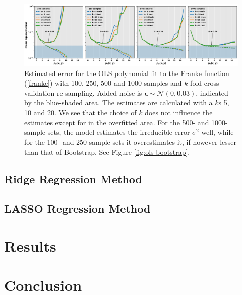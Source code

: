 \documentclass[]{article}
\begin{document}
\begin{figure}[!htb]
	\centering
	\includegraphics[width=1\linewidth]{./results/ols-cv.png}
	\caption{Estimated error for the OLS polynomial fit to the Franke function (\ref{franke}) with 100, 250, 500 and 1000 samples and $k$-fold cross validation re-sampling. Added noise is $\mathbf{\epsilon} \sim \mathcal{N}(0, 0.03)$, indicated by the blue-shaded area. The estimates are calculated with a $k$s 5, 10 and 20. We see that the choice of $k$ does not influence the estimates except for in the overfitted area. For the 500- and 1000-sample sets, the model estimates the irreducible error $\sigma^2$ well, while for the 100- and 250-sample sets it overestimates it, if however lesser than that of Bootstrap. See Figure \ref{fig:ols-bootstrap}.}
	\label{fig:ols-cv}
\end{figure}

\subsection{Ridge Regression Method}


\subsection{LASSO Regression Method}


\section{Results}



\section{Conclusion}





\end{document}
